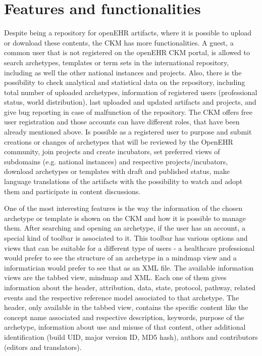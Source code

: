\documentclass[mim_thesis.tex]{subfiles}
\begin{document}
\section{Features and functionalities}
Despite being a repository for openEHR artifacts, where it is possible to upload or download these contents, the CKM has more functionalities. A guest, a common user that is not registered on the openEHR CKM portal, is allowed to search archetypes, templates or term sets in the international repository, including as well the other national instances and projects. Also, there is the possibility to check analytical and statistical data on the repository, including total number of uploaded archetypes, information of registered users (professional status, world distribution), last uploaded and updated artifacts and projects, and give bug reporting in case of malfunction of the repository. The CKM offers free user registration and those accounts can have different roles, that have been already mentioned above. Is possible as a registered user to purpose and submit creations or changes of archetypes that will be reviewed by the OpenEHR community, join projects and create incubators, set preferred views of subdomains (e.g. national instances) and respective projects/incubators, download archetypes or templates with draft and published status, make language translations of the artifacts with the possibility to watch and adopt them and participate in content discussions. 

One of the most interesting features is the way the information of the chosen archetype or template is shown on the CKM and how it is possible to manage them. After searching and opening an archetype, if the user has an account, a special kind of toolbar is associated to it. This toolbar has various options and views that can be suitable for a different type of users - a healthcare professional would prefer to see the structure of an archetype in a mindmap view and a informatician would prefer to see that as an XML file. The available information views are the tabbed view, mindmap and XML. Each one of them gives information about the header, attribution, data, state, protocol, pathway, related events and the respective reference model associated to that archetype. The header, only available in the tabbed view, contains the specific content like the concept name associated and respective description, keywords, purpose of the archetype, information about use and misuse of that content, other additional identification (build UID, major version ID, MD5 hash), authors and contributors (editors and translators). 
\end{document}
